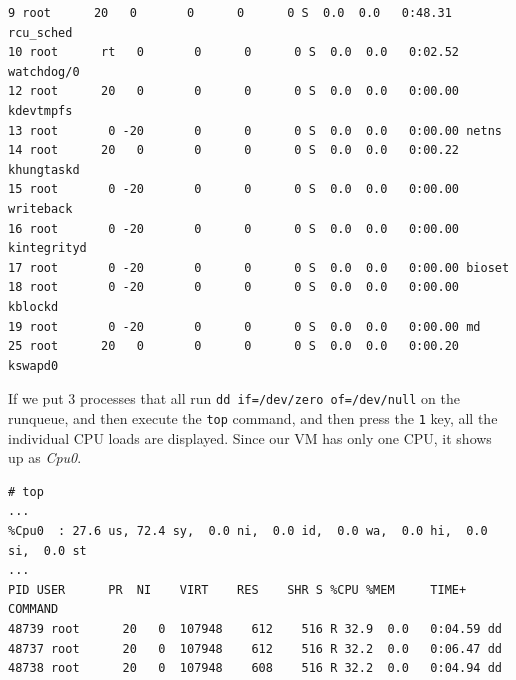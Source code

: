 \begin{verbatim}
9 root      20   0       0      0      0 S  0.0  0.0   0:48.31 rcu_sched                                                                  
10 root      rt   0       0      0      0 S  0.0  0.0   0:02.52 watchdog/0                                                                 
12 root      20   0       0      0      0 S  0.0  0.0   0:00.00 kdevtmpfs                                                                  
13 root       0 -20       0      0      0 S  0.0  0.0   0:00.00 netns                                                                      
14 root      20   0       0      0      0 S  0.0  0.0   0:00.22 khungtaskd                                                                 
15 root       0 -20       0      0      0 S  0.0  0.0   0:00.00 writeback                                                                  
16 root       0 -20       0      0      0 S  0.0  0.0   0:00.00 kintegrityd                                                                
17 root       0 -20       0      0      0 S  0.0  0.0   0:00.00 bioset                                                                     
18 root       0 -20       0      0      0 S  0.0  0.0   0:00.00 kblockd                                                                    
19 root       0 -20       0      0      0 S  0.0  0.0   0:00.00 md                                                                         
25 root      20   0       0      0      0 S  0.0  0.0   0:00.20 kswapd0                                                                    
\end{verbatim}
\vspace{-10pt}

\noindent
If we put 3 processes that all run \verb|dd if=/dev/zero of=/dev/null| on the runqueue, and then execute the \verb|top| command, and then press the \verb|1| key, all the individual CPU loads are displayed. Since our VM has only one CPU, it shows up as \textit{Cpu0}.

\vspace{-15pt}
\begin{verbatim}
# top
...
%Cpu0  : 27.6 us, 72.4 sy,  0.0 ni,  0.0 id,  0.0 wa,  0.0 hi,  0.0 si,  0.0 st
...
PID USER      PR  NI    VIRT    RES    SHR S %CPU %MEM     TIME+ COMMAND                                                                    
48739 root      20   0  107948    612    516 R 32.9  0.0   0:04.59 dd                                                                         
48737 root      20   0  107948    612    516 R 32.2  0.0   0:06.47 dd                                                                         
48738 root      20   0  107948    608    516 R 32.2  0.0   0:04.94 dd                                                                         
\end{verbatim}
\vspace{-10pt}

